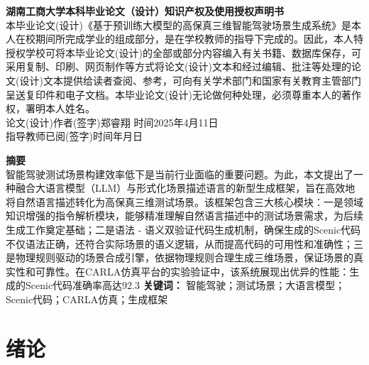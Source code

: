 \documentclass{article}
\begin{document}
\newpage
\begin{titlepage}
    \centering
    \vspace*{2cm}
    \textbf{\LARGE 湖南工商大学本科毕业论文（设计）知识产权及使用授权声明书}\\[2em]
   本毕业论文(设计)《基于预训练大模型的高保真三维智能驾驶场景生成系统》是本人在校期间所完成学业的组成部分，是在学校教师的指导下完成的。因此，本人特授权学校可将本毕业论文(设计)的全部或部分内容编入有关书籍、数据库保存，可采用复制、印刷、网页制作等方式将论文(设计)文本和经过编辑、批注等处理的论文(设计)文本提供给读者查阅、参考，可向有关学术部门和国家有关教育主管部门呈送复印件和电子文档。本毕业论文(设计)无论做何种处理，必须尊重本人的著作权，署明本人姓名。\\[2em]
    论文(设计)作者(签字)郑睿翔
    时间2025年4月11日\\
    指导教师已阅(签字)时间年月日
    \\[1em]
\end{titlepage}

\newpage
\tableofcontents

\newpage

\begin{titlepage}
    \centering
    \textbf{\LARGE 摘\quad 要}\\[2em]
    智能驾驶测试场景构建效率低下是当前行业面临的重要问题。为此，本文提出了一种融合大语言模型（LLM）与形式化场景描述语言的新型生成框架，旨在高效地将自然语言描述转化为高保真三维测试场景。该框架包含三大核心模块：一是领域知识增强的指令解析模块，能够精准理解自然语言描述中的测试场景需求，为后续生成工作奠定基础；二是语法 - 语义双验证代码生成机制，确保生成的Scenic代码不仅语法正确，还符合实际场景的语义逻辑，从而提高代码的可用性和准确性；三是物理规则驱动的场景合成引擎，依据物理规则合理生成三维场景，保证场景的真实性和可靠性。在CARLA仿真平台的实验验证中，该系统展现出优异的性能：生成的Scenic代码准确率高达92.3%
    \textbf{关键词：} 智能驾驶；测试场景；大语言模型；Scenic代码；CARLA仿真；生成框架
\end{titlepage}
\section{绪论}
\end{document}
